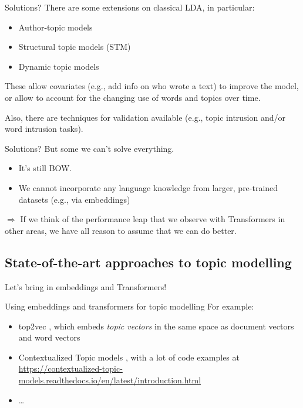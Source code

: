 \begin{frame}{Solutions?}
There are some extensions on classical LDA, in particular:
\begin{itemize}
\item Author-topic models
\item Structural topic models (STM) \parencite{Roberts2014}
\item Dynamic topic models \parencite{Blei2006}
\end{itemize}

These allow covariates (e.g., add info on who wrote a text) to improve the model, or allow to account for the changing use of words and topics over time.

Also, there are techniques for validation available (e.g., topic intrusion and/or word intrusion tasks).
\end{frame}


\begin{frame}{Solutions?}
  But some we can't solve everything.

  \begin{itemize}
  \item It's still BOW.
  \item We cannot incorporate any language knowledge from larger, pre-trained datasets (e.g., via embeddings)
  \end{itemize}

$\Rightarrow$ If we think of the performance leap that we observe with Transformers in other areas, we have all reason to assume that we can do better.
\end{frame}



\subsection{State-of-the-art approaches to topic modelling}

\begin{frame}[standout]
Let's bring in embeddings and Transformers!
\end{frame}


\begin{frame}{Using embeddings and transformers for topic modelling}
  For example:
  \begin{itemize}[<+->]
  \item top2vec \parencite{angelov2020top2vec}, which embeds \emph{topic vectors} in the same space as document vectors and word vectors
  \item Contextualized Topic models \parencite{bianchi-etal-2021-pre,bianchi-etal-2021-cross}, with a lot of code examples at \url{https://contextualized-topic-models.readthedocs.io/en/latest/introduction.html}
  \item \ldots
    \end{itemize}
 
\end{frame}



